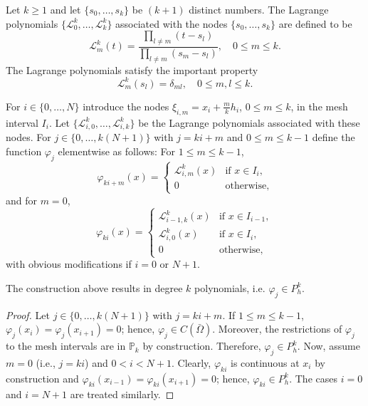 \begin{definition}\label{def:lagrangepolynomials}
    Let $k \ge 1$ and let $\{s_0, \dots, s_k\}$ be $(k+1)$ distinct numbers. The Lagrange polynomials $\{\mathcal{L}_0^k, \dots, \mathcal{L}_k^k\}$ associated with the nodes $\{s_0, \dots, s_k\}$ are defined to be
    \begin{equation*}
\mathcal{L}_m^k(t) = \frac{\prod_{l \ne m}(t - s_l)}{\prod_{l \ne m}(s_m - s_l)}, \quad 0 \le m \le k.
\end{equation*}
    The Lagrange polynomials satisfy the important property
    \begin{equation*}
\mathcal{L}_m^k(s_l) = \delta_{ml}, \quad 0 \le m,l \le k.
\end{equation*}
\end{definition}
For $i \in \{0, \dots, N\}$ introduce the nodes $\xi_{i,m} = x_i + \frac{m}{k}h_i$, $0 \le m \le k$, in the mesh interval $I_i$. Let $\{\mathcal{L}_{i,0}^k, \dots, \mathcal{L}_{i,k}^k\}$ be the Lagrange polynomials associated with these nodes. For $j \in \{0, \dots, k(N+1)\}$ with $j = ki + m$ and $0 \le m \le k-1$ define the function $\varphi_j$ elementwise as follows: For $1 \le m \le k-1$,
\begin{equation*}
\varphi_{ki+m}(x) = \begin{cases} \mathcal{L}_{i,m}^k(x) & \text{if } x \in I_i, \\ 0 & \text{otherwise}, \end{cases}
\end{equation*}
and for $m=0$,
\begin{equation*}
\varphi_{ki}(x) = \begin{cases} \mathcal{L}_{i-1,k}^k(x) & \text{if } x \in I_{i-1}, \\ \mathcal{L}_{i,0}^k(x) & \text{if } x \in I_i, \\ 0 & \text{otherwise}, \end{cases}
\end{equation*}
with obvious modifications if $i = 0$ or $N+1$.
\begin{lemma}\label{basis_functions_Pk}
    The construction above results in degree $k$ polynomials, i.e. $\varphi_j \in P_h^k$.
\begin{proof}
    Let $j \in \{0, \dots, k(N+1)\}$ with $j = ki + m.$ If $1 \le m \le k-1$, $\varphi_j(x_i) = \varphi_j(x_{i+1}) = 0$; hence, $\varphi_j \in C(\bar{\Omega})$. Moreover, the restrictions of $\varphi_j$ to the mesh intervals are in $\mathbb{P}_k$ by construction. Therefore, $\varphi_j \in P_h^k$. Now, assume $m = 0$ (i.e., $j=ki$) and $0 < i < N+1$. Clearly, $\varphi_{ki}$ is continuous at $x_i$ by construction and $\varphi_{ki}(x_{i-1}) = \varphi_{ki}(x_{i+1}) = 0$; hence, $\varphi_{ki} \in P_h^k$. The cases $i = 0$ and $i = N+1$ are treated similarly.
\end{proof}
\end{lemma}
